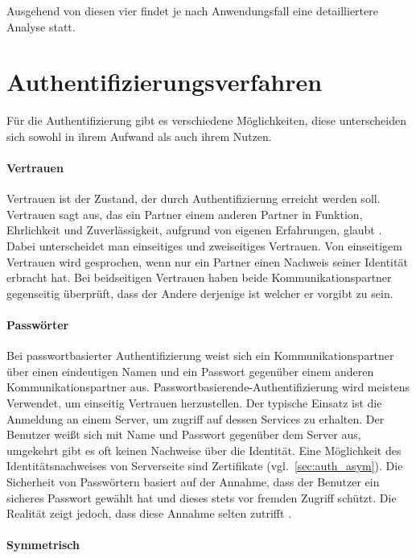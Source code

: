 \documentclass[11pt,a4paper]{report}
\begin{document}
Ausgehend von diesen vier findet je nach Anwendungsfall eine detailliertere Analyse statt.

\section{Authentifizierungsverfahren} \label{auth_modells}

Für die Authentifizierung gibt es verschiedene Möglichkeiten, diese unterscheiden sich sowohl in ihrem Aufwand als auch ihrem Nutzen.

\paragraph{Vertrauen}

Vertrauen ist der Zustand, der durch Authentifizierung erreicht werden soll. Vertrauen sagt aus, das ein Partner einem anderen Partner in Funktion, Ehrlichkeit und Zuverlässigkeit, aufgrund von eigenen Erfahrungen, glaubt \cite{chen}. Dabei unterscheidet man einseitiges und zweiseitiges Vertrauen. Von einseitigem Vertrauen wird gesprochen, wenn nur ein Partner einen Nachweis seiner Identität erbracht hat. Bei beidseitigen Vertrauen haben beide Kommunikationspartner gegenseitig überprüft, dass der Andere derjenige ist welcher er vorgibt zu sein.

\paragraph{Passwörter}

Bei passwortbasierter Authentifizierung weist sich ein Kommunikationspartner über einen eindeutigen Namen und ein Passwort gegenüber einem anderen Kommunikationspartner aus. Passwortbasierende-Authentifizierung wird meistens Verwendet, um einseitig Vertrauen herzustellen. Der typische Einsatz ist die Anmeldung an einem Server, um zugriff auf dessen Services zu erhalten. Der Benutzer weißt sich mit Name und Passwort gegenüber dem Server aus, umgekehrt gibt es oft keinen Nachweise über die Identität. Eine Möglichkeit des Identitätsnachweises von Serverseite sind Zertifikate (vgl.~\ref{sec:auth_asym}). Die Sicherheit von Passwörtern basiert auf der Annahme, dass der Benutzer ein sicheres Passwort gewählt hat und dieses stets vor fremden Zugriff schützt. Die Realität zeigt jedoch, dass diese Annahme selten zutrifft \cite{gutmann2}.

\paragraph{Symmetrisch}
\end{document}
